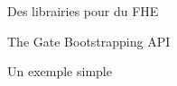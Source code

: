\begin{section}{Des librairies pour du FHE}
\begin{subsection}{The Gate Bootstrapping API}
\begin{subsubsection}{Un exemple simple}
	
\end{subsubsection} %
\end{subsection} %
\end{section}
